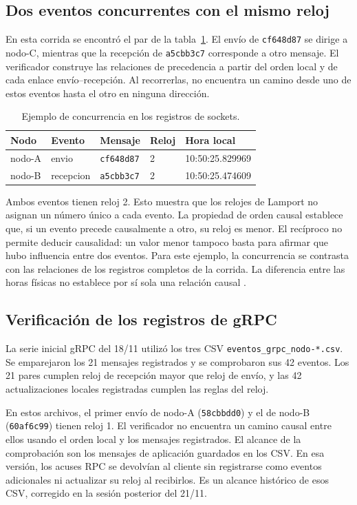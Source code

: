 \subsection{Dos eventos concurrentes con el mismo reloj}
En esta corrida se encontró el par de la tabla~\ref{tab:lamport-concurrentes}.
El envío de \texttt{cf648d87} se dirige a nodo-C, mientras que la
recepción de \texttt{a5cbb3c7} corresponde a otro mensaje.
El verificador construye las relaciones de precedencia a partir del orden
local y de cada enlace envío--recepción. Al recorrerlas, no encuentra
un camino desde uno de estos eventos hasta el otro en ninguna dirección.

\begin{table}[htbp]
\centering
\caption{Ejemplo de concurrencia en los registros de sockets.}
\label{tab:lamport-concurrentes}
\small
\begin{tabular}{lllll}
\toprule
\textbf{Nodo} & \textbf{Evento} & \textbf{Mensaje} & \textbf{Reloj} & \textbf{Hora local} \\
\midrule
nodo-A & envio & \texttt{cf648d87} & 2 & 10:50:25.829969 \\
nodo-B & recepcion & \texttt{a5cbb3c7} & 2 & 10:50:25.474609 \\
\bottomrule
\end{tabular}
\end{table}

Ambos eventos tienen reloj 2. Esto muestra que los relojes de Lamport no
asignan un número único a cada evento. La propiedad de orden causal
establece que, si un evento precede causalmente a otro, su reloj es menor.
El recíproco no permite deducir causalidad: un valor menor tampoco
basta para afirmar que hubo influencia entre dos eventos.
Para este ejemplo, la concurrencia se contrasta con las relaciones de
los registros completos de la corrida. La diferencia entre las horas
físicas no establece por sí sola una relación causal
\cite{vansteen2023distributed}.

\subsection{Verificación de los registros de gRPC}
La serie inicial gRPC del 18/11 utilizó los tres CSV
\texttt{eventos\_grpc\_nodo-*.csv}. Se emparejaron los 21 mensajes
registrados y se comprobaron sus 42 eventos. Los 21 pares cumplen
reloj de recepción mayor que reloj de envío, y las 42 actualizaciones
locales registradas cumplen las reglas del reloj.

En estos archivos, el primer envío de nodo-A
(\texttt{58cbbdd0}) y el de nodo-B (\texttt{60af6c99})
tienen reloj 1. El verificador no encuentra un camino causal
entre ellos usando el orden local y los mensajes registrados.
El alcance de la comprobación son los mensajes de aplicación
guardados en los CSV. En esa versión, los acuses RPC se devolvían al cliente sin registrarse
como eventos adicionales ni actualizar su reloj al recibirlos. Es un
alcance histórico de esos CSV, corregido en la sesión posterior del 21/11.

